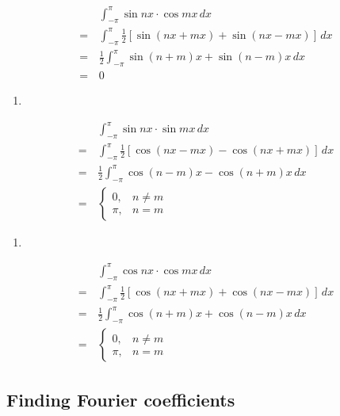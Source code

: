\documentclass[
  letterpaper,
  DIV=11,
  numbers=noendperiod,
  oneside]{scrreprt}
\providecommand{\tightlist}{%
  \setlength{\itemsep}{0pt}\setlength{\parskip}{0pt}}
\begin{document}
\begin{align*}
    &\, \int_{-\pi}^{\pi} \sin nx \cdot \cos mx \,dx \\
    =&\, \int_{-\pi}^{\pi} \frac{1}{2}\left[\sin(nx + mx) + \sin(nx - mx)\right] \,dx \\
    =&\, \frac{1}{2} \int_{-\pi}^{\pi} \sin(n + m)x + \sin(n - m)x \,dx \\
    =&\, 0
\end{align*}

\begin{enumerate}
\def\labelenumi{\alph{enumi}.}
\setcounter{enumi}{1}
\tightlist
\item
\end{enumerate}

\begin{align*}
    &\, \int_{-\pi}^{\pi} \sin nx \cdot \sin mx \,dx \\
    =&\, \int_{-\pi}^{\pi} \frac{1}{2}\left[\cos(nx - mx) - \cos(nx + mx)\right] \,dx \\
    =&\, \frac{1}{2} \int_{-\pi}^{\pi} \cos(n - m)x - \cos(n + m)x \,dx \\
    =&\, \begin{cases}
        0, & n \ne m \\
        \pi, & n = m
    \end{cases}
\end{align*}

\begin{enumerate}
\def\labelenumi{\alph{enumi}.}
\setcounter{enumi}{2}
\tightlist
\item
\end{enumerate}

\begin{align*}
    &\, \int_{-\pi}^{\pi} \cos nx \cdot \cos mx \,dx \\
    =&\, \int_{-\pi}^{\pi} \frac{1}{2}\left[\cos(nx + mx) + \cos(nx - mx)\right] \,dx \\
    =&\, \frac{1}{2} \int_{-\pi}^{\pi} \cos(n + m)x + \cos(n - m)x \,dx \\
    =&\, \begin{cases}
        0, & n \ne m \\
        \pi, & n = m
    \end{cases}
\end{align*}

\subsection{Finding Fourier
coefficients}\label{finding-fourier-coefficients}
\end{document}
